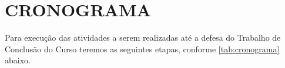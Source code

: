 % 
%


\chapter{CRONOGRAMA}

Para execução das atividades a serem realizadas até a defesa do Trabalho de Conclusão do Curso teremos as seguintes etapas, conforme \autoref{tab:cronograma} abaixo.

